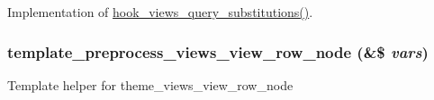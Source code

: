 Implementation of \hyperlink{group__views__hooks_g2a2f60cadfec300b51a4960080ef8ac5}{hook\_\-views\_\-query\_\-substitutions()}. \hypertarget{group__views__node__module_g7ab8a726f775b848f49ada743dae0e58}{
\subsubsection[{template\_\-preprocess\_\-views\_\-view\_\-row\_\-node}]{\setlength{\rightskip}{0pt plus 5cm}template\_\-preprocess\_\-views\_\-view\_\-row\_\-node (\&\$ {\em vars})}}
\label{group__views__node__module_g7ab8a726f775b848f49ada743dae0e58}


Template helper for theme\_\-views\_\-view\_\-row\_\-node 